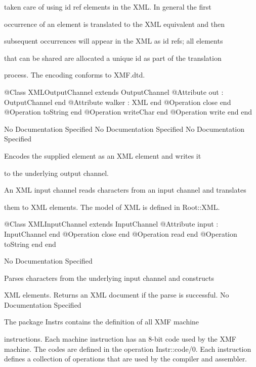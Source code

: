       taken care of using id ref elements in the XML. In general the first

      occurrence of an element is translated to the XML equivalent and then

      subsequent occurrences will appear in the XML as id refs; all elements

      that can be shared are allocated a unique id as part of the translation

      process. The encoding conforms to XMF.dtd.
\begin{Interface}
@Class XMLOutputChannel extends OutputChannel
  @Attribute out : OutputChannel end
  @Attribute walker : XML end
  @Operation close end
  @Operation toString end
  @Operation writeChar end
  @Operation write end
end
\end{Interface}
No Documentation Specified
No Documentation Specified
No Documentation Specified

        Encodes the supplied element as an XML element and writes it

        to the underlying output channel.

      An XML input channel reads characters from an input channel and translates

      them to XML elements. The model of XML is defined in Root::XML.
\begin{Interface}
@Class XMLInputChannel extends InputChannel
  @Attribute input : InputChannel end
  @Operation close end
  @Operation read end
  @Operation toString end
end
\end{Interface}
No Documentation Specified

        Parses characters from the underlying input channel and constructs

        XML elements. Returns an XML document if the parse is successful.
No Documentation Specified

    The package Instrs contains the definition of all XMF machine

    instructions. Each machine instruction has an 8-bit code used by 
    the XMF machine. The codes are defined in the operation Instr::code/0.
    Each instruction defines a collection of operations that are used by 
    the compiler and assembler.


